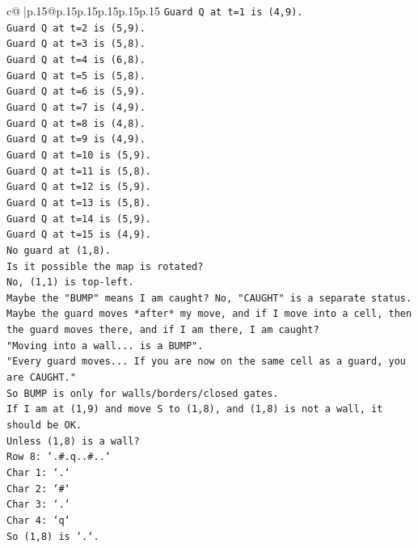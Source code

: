 \documentclass{article}
\begin{document}
{\begin{supertabular}{c@{$\;$}|p{.15\linewidth}@{}p{.15\linewidth}p{.15\linewidth}p{.15\linewidth}p{.15\linewidth}p{.15\linewidth}}
{{{\texttt{Guard Q at t=1 is (4,9).} \\
\texttt{Guard Q at t=2 is (5,9).} \\
\texttt{Guard Q at t=3 is (5,8).} \\
\texttt{Guard Q at t=4 is (6,8).} \\
\texttt{Guard Q at t=5 is (5,8).} \\
\texttt{Guard Q at t=6 is (5,9).} \\
\texttt{Guard Q at t=7 is (4,9).} \\
\texttt{Guard Q at t=8 is (4,8).} \\
\texttt{Guard Q at t=9 is (4,9).} \\
\texttt{Guard Q at t=10 is (5,9).} \\
\texttt{Guard Q at t=11 is (5,8).} \\
\texttt{Guard Q at t=12 is (5,9).} \\
\texttt{Guard Q at t=13 is (5,8).} \\
\texttt{Guard Q at t=14 is (5,9).} \\
\texttt{Guard Q at t=15 is (4,9).} \\
\texttt{No guard at (1,8).} \\
\texttt{Is it possible the map is rotated?} \\
\texttt{No, (1,1) is top{-}left.} \\
\texttt{Maybe the "BUMP" means I am caught? No, "CAUGHT" is a separate status.} \\
\texttt{Maybe the guard moves *after* my move, and if I move into a cell, then the guard moves there, and if I am there, I am caught?} \\
\texttt{"Moving into a wall... is a BUMP".} \\
\texttt{"Every guard moves... If you are now on the same cell as a guard, you are CAUGHT."} \\
\texttt{So BUMP is only for walls/borders/closed gates.} \\
\texttt{If I am at (1,9) and move S to (1,8), and (1,8) is not a wall, it should be OK.} \\
\texttt{Unless (1,8) is a wall?} \\
\texttt{Row 8: `.\#.q..\#..`} \\
\texttt{Char 1: `.`} \\
\texttt{Char 2: `\#`} \\
\texttt{Char 3: `.`} \\
\texttt{Char 4: `q`} \\
\texttt{So (1,8) is `.`.} \\
}}}
\end{supertabular}}
\end{document}
